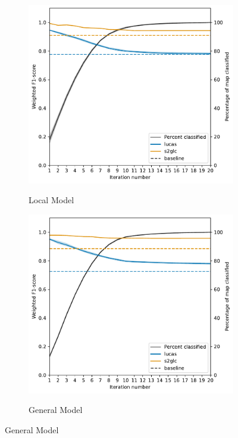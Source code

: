         \begin{figure}
            \vspace*{-4cm}
            \centering
            \begin{subfigure}[b]{0.82\textwidth}
            \centering
            \caption{Local Model}\includegraphics[width=\textwidth]{figs_04/fig12a_f1_during_filling_local.pdf}
            \label{fig:f1_filling_local}
            \hspace{-0.9em}
            
            \end{subfigure}
            
            \begin{subfigure}[b]{0.82\textwidth}
           \centering
           \caption{General Model}
           \includegraphics[width=\textwidth]{figs_04/fig12b_f1_during_filling_general.pdf}
           \label{fig:f1_filling_general}
           

\end{subfigure}
\end{figure}
